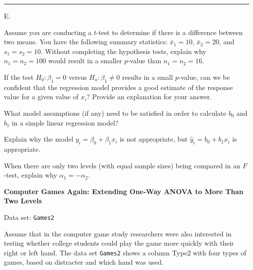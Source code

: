 \documentclass[
]{report}
\newcounter{excount}
\renewcommand{\theexcount}{E\arabic{excount}}
\begin{document}
\vspace{-2em}

\noindent

\rule{\linewidth}{0.4pt}

\setcounter{excount}{0}

\begin{list}{\theexcount.}{ \setlength{\itemsep}{1.2em}}

  \item Assume you are conducting a $t$-test to determine if there is a difference between two means. You have the following summary statistics: $\bar{x}_1 = 10$, $\bar{x}_2 = 20$, and $s_1 = s_2 = 10$. Without completing the hypothesis tests, explain why $n_1 = n_2 = 100$ would result in a smaller $p$-value than $n_1 = n_2 = 16$.

  \item If the test $H_0\colon \beta_1 = 0$ versus $H_a\colon \beta_1 \ne 0$ results in a small $p$-value, can we be confident that the regression model provides a good estimate of the response value for a given value of $x_i$? Provide an explanation for your answer.

  \item What model assumptions (if any) need to be satisfied in order to calculate $b_0$ and $b_1$ in a simple linear regression model?

  \item Explain why the model $y_i = \beta_0 + \beta_1 x_i$ is not appropriate, but $\hat{y}_i = b_0 + b_1 x_i$ is appropriate.

  \item When there are only two levels (with equal sample sizes) being compared in an $F$-test, explain why $\alpha_1 = -\alpha_2$.

  \item \textbf{Computer Games Again: Extending One-Way ANOVA to More Than Two Levels}

Data set: \texttt{Games2}

Assume that in the computer game study researchers were also interested in testing whether college students could play the game more quickly with their right or left hand. The data set \texttt{Games2} shows a column Type2 with four types of games, based on distracter and which hand was used.


\end{list}
\end{document}
